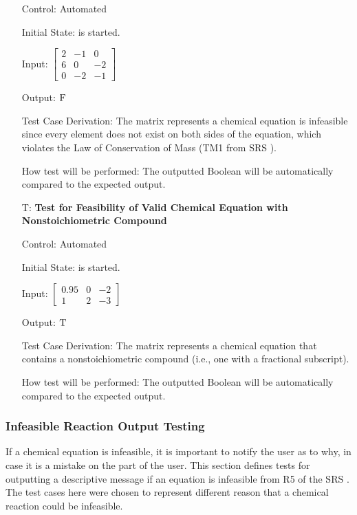 \documentclass[12pt, titlepage]{article}
\newcounter{testnum} %
\begin{document}
\begin{enumerate}
    Control: Automated

    Initial State: \progname{} is started.

    Input: $\begin{bmatrix}
        2 & -1 & 0  \\
        6 & 0  & -2 \\
        0 & -2 & -1
      \end{bmatrix}$

    Output: $\textsc{F}$

    Test Case Derivation: The matrix represents a chemical equation is
    infeasible since
    every element does not exist on both sides of the equation, which violates
    the Law of Conservation of Mass (TM1 from SRS ).

    How test will be performed: The outputted Boolean will be automatically
    compared to the expected output.

  \item[T\refstepcounter{testnum}\thetestnum \label{test_nonstoich_valid_feas}:]
    \textbf{Test for Feasibility of Valid Chemical Equation with
      Nonstoichiometric Compound}

    Control: Automated

    Initial State: \progname{} is started.

    Input:
    $\begin{bmatrix}
        0.95 & 0 & -2 \\
        1    & 2 & -3
      \end{bmatrix}$

    Output: $\textsc{T}$

    Test Case Derivation: The matrix represents a chemical equation that
    contains a nonstoichiometric compound (i.e., one with a fractional
    subscript).

    How test will be performed: The outputted Boolean will be automatically
    compared to the expected output.

\end{enumerate}

\subsubsection{Infeasible Reaction Output Testing}

If a chemical equation is infeasible, it is important to notify the user as to
why, in case it is a mistake on the part of the user. This section defines
tests for outputting a descriptive message if an equation is infeasible from
R5 of the SRS . 
The test cases here were chosen to represent different reason that a chemical
reaction could be infeasible.
\end{document}
